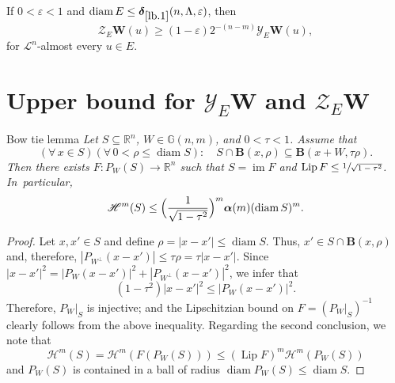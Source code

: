 \documentclass[JEP,XML,SOM,Unicode,ThmDefs,NoEqCountersInSection]{cedram}
\newenvironment{Empty}[2][\null]{%
\begin{enonce}[remark]{#1}#2}
{\end{enonce}}
\newcommand{\R}{\mathbb{R}}
\newcommand{\Rn}{\R^n}
\newcommand{\calH}{\mathscr{H}}
\newcommand{\calL}{\mathscr{L}}
\newcommand{\calY}{\mathscr{Y}}
\newcommand{\calZ}{\mathscr{Z}}
\newcommand{\balpha}{\boldsymbol{\alpha}}
\newcommand{\bdelta}{\boldsymbol{\delta}}
\newcommand{\bB}{{\boldsymbol{B}}}
\newcommand{\bW}{{\boldsymbol{W}}}
\newcommand{\bG}{\mathbb{G}}
\DeclareMathOperator{\rmdiam}{\mathrm{diam}}
\DeclareMathOperator{\rmim}{\mathrm{im}}
\DeclareMathOperator{\rmLip}{\mathrm{Lip}}
\let\veps\varepsilon
\let\subset\subseteq
\begin{document}
\begin{corollary}
\label{lb.2}
If $0 < \veps < 1$ and $\rmdiam E \leq \bdelta_{\ref{lb.1}}(n,\Lambda,\veps)$, then
\begin{equation*}
\calZ_E \bW(u) \geq (1-\veps) 2^{-(n-m)}\calY_E \bW(u),
\end{equation*}
for $\calL^n$-almost every $u \in E$.
\end{corollary}

\section{Upper bound for \texorpdfstring{$\calY_E \bW$ and $\calZ_E \bW$}{YZ}}\label{sec:6}

\begin{Empty}[Bow tie lemma]
\label{bow.tie}
{\it
Let $S \subset \Rn$, $W \in \bG(n,m)$, and $0 < \tau < 1$. Assume that
\begin{equation*}
(\forall \,x \in S)(\forall \,0 < \rho \leq \rmdiam S):\quad S \cap \bB(x,\rho) \subset \bB(x+W,\tau\rho).
\end{equation*}
Then there exists $F: P_W(S) \to \Rn$ such that $S=\rmim F$ and $\rmLip F \leq \sfrac{1}{\sqrt{1-\tau^2}}$. In~particular,
\begin{equation*}
\calH^m(S) \leq \Bigl(\frac{1}{\sqrt{1-\tau^2}} \Bigr)^m \balpha(m) (\rmdiam S)^m.
\end{equation*}
}
\end{Empty}

\begin{proof}
Let $x,x' \in S$ and define $\rho = |x-x'| \leq \rmdiam S$.
Thus, $x' \in S \cap \bB(x,\rho)$ and, therefore, $\left|P_{W^\perp}(x-x') \right| \leq \tau \rho = \tau |x-x'|$.
Since $|x-x'|^2 = \left|P_{W}(x-x') \right|^2 + \left|P_{W^\perp}(x-x') \right|^2$, we infer that
\begin{equation*}
(1-\tau^2) \left|x-x'\right|^2 \leq \left|P_{W}(x-x') \right|^2.
\end{equation*}
Therefore, $P_W|_S$ is injective; and the Lipschitzian bound on $F = \left(P_W|_S \right)^{-1}$ clearly follows from the above inequality.
Regarding the second conclusion, we note that
\begin{equation*}
\calH^m(S) = \calH^m\left(F(P_W(S)) \right) \leq \left(\rmLip F\right)^m \calH^m \left(P_W(S) \right)
\end{equation*}
and $P_W(S)$ is contained in a ball of radius $\rmdiam P_W(S) \leq \rmdiam S$.
\end{proof}
\end{document}
